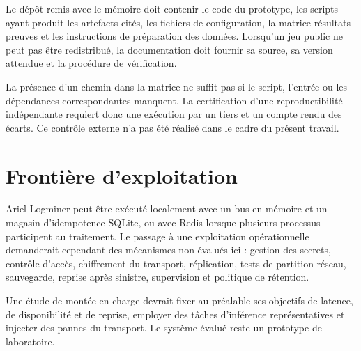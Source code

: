 Le dépôt remis avec le mémoire doit contenir le code du prototype, les scripts ayant produit
les artefacts cités, les fichiers de configuration, la matrice résultats--preuves et les
instructions de préparation des données. Lorsqu'un jeu public ne peut pas être redistribué,
la documentation doit fournir sa source, sa version attendue et la procédure de vérification.

La présence d'un chemin dans la matrice ne suffit pas si le script, l'entrée ou les
dépendances correspondantes manquent. La certification d'une reproductibilité indépendante
requiert donc une exécution par un tiers et un compte rendu des écarts. Ce contrôle externe
n'a pas été réalisé dans le cadre du présent travail.

\section{Frontière d'exploitation}

Ariel Logminer peut être exécuté localement avec un bus en mémoire et un magasin
d'idempotence SQLite, ou avec Redis lorsque plusieurs processus participent au traitement.
Le passage à une exploitation opérationnelle demanderait cependant des mécanismes non
évalués ici : gestion des secrets, contrôle d'accès, chiffrement du transport, réplication,
tests de partition réseau, sauvegarde, reprise après sinistre, supervision et politique de
rétention.

Une étude de montée en charge devrait fixer au préalable ses objectifs de latence, de
disponibilité et de reprise, employer des tâches d'inférence représentatives et injecter des
pannes du transport. Le système évalué reste un prototype de laboratoire.
